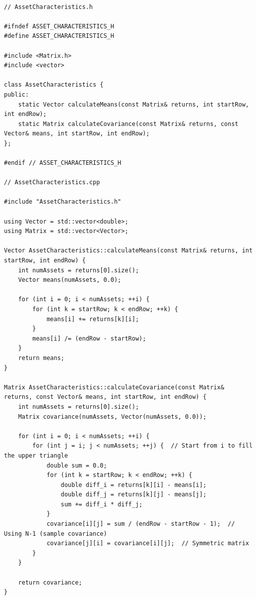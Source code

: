 \documentclass[12pt,twoside]{article}
\begin{document}
\begin{verbatim}

// AssetCharacteristics.h

#ifndef ASSET_CHARACTERISTICS_H
#define ASSET_CHARACTERISTICS_H

#include <Matrix.h>
#include <vector>

class AssetCharacteristics {
public:
    static Vector calculateMeans(const Matrix& returns, int startRow, int endRow);
    static Matrix calculateCovariance(const Matrix& returns, const Vector& means, int startRow, int endRow);
};

#endif // ASSET_CHARACTERISTICS_H

// AssetCharacteristics.cpp

#include "AssetCharacteristics.h"

using Vector = std::vector<double>;
using Matrix = std::vector<Vector>;

Vector AssetCharacteristics::calculateMeans(const Matrix& returns, int startRow, int endRow) {
    int numAssets = returns[0].size();
    Vector means(numAssets, 0.0);

    for (int i = 0; i < numAssets; ++i) {
        for (int k = startRow; k < endRow; ++k) {
            means[i] += returns[k][i];
        }
        means[i] /= (endRow - startRow);
    }
    return means;
}

Matrix AssetCharacteristics::calculateCovariance(const Matrix& returns, const Vector& means, int startRow, int endRow) {
    int numAssets = returns[0].size();
    Matrix covariance(numAssets, Vector(numAssets, 0.0));

    for (int i = 0; i < numAssets; ++i) {
        for (int j = i; j < numAssets; ++j) {  // Start from i to fill the upper triangle
            double sum = 0.0;
            for (int k = startRow; k < endRow; ++k) {
                double diff_i = returns[k][i] - means[i];
                double diff_j = returns[k][j] - means[j];
                sum += diff_i * diff_j;
            }
            covariance[i][j] = sum / (endRow - startRow - 1);  // Using N-1 (sample covariance)
            covariance[j][i] = covariance[i][j];  // Symmetric matrix
        }
    }

    return covariance;
}

\end{verbatim}
\end{document}
